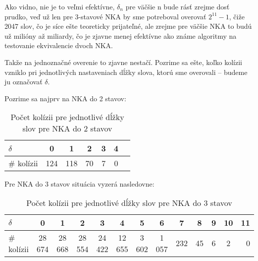 Ako vidno, nie je to veľmi efektívne, $\delta_n$ pre väčšie n bude rásť zrejme dosť prudko, veď už len pre 3-stavové NKA by sme potreboval overovať $2^{11} - 1$, čiže 2047 slov, čo je síce ešte teoreticky prijateľné, ale zrejme pre väčšie NKA to budú už milióny až miliardy, čo je zjavne menej efektívne ako známe algoritmy na testovanie ekvivalencie dvoch NKA.

Takže na jednoznačné overenie to zjavne nestačí. Pozrime sa ešte, koľko kolízii vzniklo pri jednotlivých nastaveniach dĺžky slova, ktorú sme overovali -- budeme ju označovať $\delta$.

Pozrime sa najprv na NKA do 2 stavov:
\begin{table}[h]
  \centering
  \begin{tabular}{|l|c|c|c|c|c|r|}
    \hline
    $\delta$ & 0 & 1 & 2 & 3 & 4 \\ 
    \hline
    \# kolízii & 124 & 118 & 70 & 7 & 0 \\
    \hline
  \end{tabular}
  \caption{Počet kolízii pre jednotlivé dĺžky slov pre NKA do 2 stavov}
\end{table}

Pre NKA do 3 stavov situácia vyzerá nasledovne:
\begin{table}[h]
  \centering
  \begin{tabular}{|l|c|c|c|c|c|c|c|c|c|c|c|r|}
    \hline
    $\delta$ & 0 & 1 & 2 & 3 & 4 & 5 & 6 & 7 & 8 & 9 & 10 & 11 \\ 
    \hline
    \# kolízii & 28 674 & 28 668 & 28 554 & 24 422 & 12 655 & 3 602 & 1 057 & 232 & 45 & 6 & 2 & 0\\ 
    \hline
  \end{tabular}
  \caption{Počet kolízii pre jednotlivé dĺžky slov pre NKA do 3 stavov}
\end{table}



